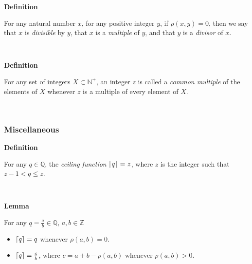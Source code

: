 \documentclass[a4paper,12pt]{article}
\DeclarePairedDelimiter{\ceil}{\lceil}{\rceil}
\begin{document}
\label{definition:divisibility}
\hypertarget{definition:divisibility}{}
\begin{tcolorbox}
\textbf{Definition}

\noindent For any natural number $x$, for any positive integer $y$, if $\rho(x,y) = 0$, then we say that $x$ is \textit{divisible} by $y$, that $x$ is a \textit{multiple} of $y$, and that $y$ is a \textit{divisor} of $x$.
\end{tcolorbox}
\noindent \\








\label{definition:common_multiple}
\hypertarget{definition:common_multiple}{}
\begin{tcolorbox}
\textbf{Definition}

\noindent For any set of integers $X \subset \mathbb{N}^+$, an integer $z$ is called a \textit{common multiple} of the elements of $X$ whenever $z$ is a multiple of every element of $X$.
\end{tcolorbox}
\noindent \\








\subsubsection{Miscellaneous}
\label{subsubsection:miscellaneous}




\label{definition:ceiling_function}
\hypertarget{definition:ceiling_function}{}
\begin{tcolorbox}
\textbf{Definition}

\noindent For any $q \in \mathbb{Q}$, the \textit{ceiling function} $\ceil{q} = z$, where $z$ is the integer such that $z - 1 < q \leq z$.
\end{tcolorbox}
\noindent \\








\label{lemma:ceiling_function}
\hypertarget{lemma:ceiling_function}{}
\begin{tcolorbox}
\textbf{Lemma}

\noindent For any $q = \frac{a}{b} \in \mathbb{Q}$, $a, b \in \mathbb{Z}$

\begin{itemize}
\item $\ceil{q} = q$ whenever $\rho(a, b) = 0$.

\item  $\ceil{q} = \frac{c}{b}$, where $c = a + b - \rho(a, b)$ whenever $\rho(a, b) > 0$.
\end{itemize}


\end{tcolorbox}
\noindent \\
\end{document}
